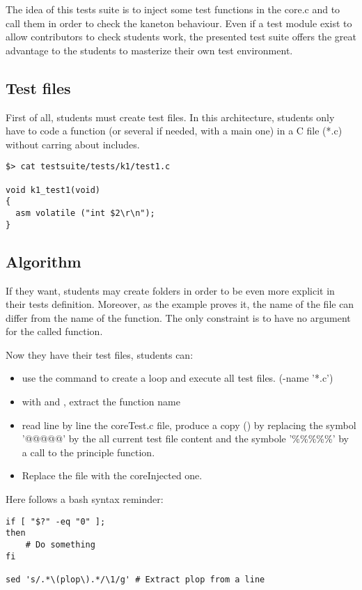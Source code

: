 The idea of this tests suite is to inject some test functions in the core.c and to call them in order to check the kaneton behaviour. Even if a test module exist to allow contributors to check students work, the presented test suite offers the great advantage to the students to masterize their own test environment.

\subsection{Test files}
First of all, students must create test files. In this architecture, students only have to code a function (or several if needed, with a main one) in a C file (*.c) without carring about includes.

\begin{verbatim}
$> cat testsuite/tests/k1/test1.c

void k1_test1(void)
{
  asm volatile ("int $2\r\n");
}
\end{verbatim}

\subsection{Algorithm}
If they want, students may create folders in order to be even more explicit in their tests definition. Moreover, as the example proves it, the name of the file can differ from the name of the function. The only constraint is to have no argument for the called function.

Now they have their test files, students can:
\begin{itemize}
\item use the  command to create a loop and execute all test files. (-name '*.c')
\item with  and , extract the function name
\item read line by line the coreTest.c file, produce a copy () by replacing the symbol '@@@@@' by the all current test file content and the symbole '\%\%\%\%\%' by a call to the principle function.
\item Replace the  file with the coreInjected one.
\end{itemize}

Here follows a bash syntax reminder:
\begin{verbatim}
if [ "$?" -eq "0" ];
then
	# Do something
fi

sed 's/.*\(plop\).*/\1/g' # Extract plop from a line
\end{verbatim}


